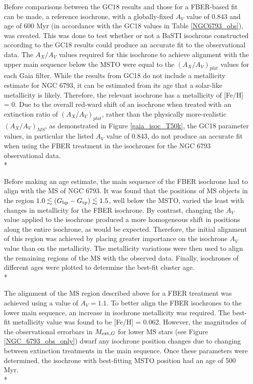 \documentclass[12pt, a4paper]{report}
\begin{document}
Before comparisons between the GC18 results and those for a FBER-based fit can be made, a reference isochrone, with a globally-fixed $A_{V}$ value of 0.843 and age of 600 Myr (in accordance with the GC18 values in Table \ref{NGC6793_obs}), was created. This was done to test whether or not a BaSTI isochrone constructed according to the GC18 results could produce an accurate fit to the observational data. The $A_{X}/A_{V}$ values required for this isochrone to achieve alignment with the upper main sequence below the MSTO were equal to the $(A_{X}/A_{V})_{plat}$ values for each Gaia filter. While the results from GC18 do not include a metallicity estimate for NGC 6793, it can be estimated from its age that a solar-like metallicity is likely. Therefore, the relevant isochrone has a metallicity of [Fe/H] = 0. Due to the overall red-ward shift of an isochrone when treated with an extinction ratio of $(A_{X}/A_{V})_{plat}$, rather than the physically more-realistic $(A_{X}/A_{V})_{MS}$, as demonstrated in Figure \ref{gaia_isoc_T50k}, the GC18 parameter values, in particular the listed $A_{V}$ value of 0.843, do not produce an accurate fit when using the FBER treatment in the isochrones for the NGC 6793 observational data.\\*

Before making an age estimate, the main sequence of the FBER isochrone had to align with the MS of NGC 6793. It was found that the positions of MS objects in the region $1.0 \lesssim (G_{\textnormal{bp}}-G_{\textnormal{rp}}) \lesssim 1.5$, well below the MSTO, varied the least with changes in metallicity for the FBER isochrone. By contrast, changing the $A_{V}$ value applied to the isochrone produced a more homogeneous shift in positions along the entire isochrone, as would be expected. Therefore, the initial alignment of this region was achieved by placing greater importance on the isochrone $A_{V}$ value than on the metallicity. The metallicity variations were then used to align the remaining regions of the MS with the observed data. Finally, isochrones of different ages were plotted to determine the best-fit cluster age. \\*

The alignment of the MS region described above for a FBER treatment was achieved using a value of $A_{V} = 1.1$. To better align the FBER isochrones to the lower main sequence, an increase in isochrone metallicity was required. The best-fit metallicity value was found to be [Fe/H] = 0.062. However, the magnitudes of the observational errorbars in $M_{\textnormal{ext},G}$ for lower MS stars (see Figure \ref{NGC_6793_obs_only}) dwarf any isochrone position changes due to changing between extinction treatments in the main sequence. Once these parameters were determined, the isochrone with best-fitting MSTO position had an age of 500 Myr.\\*
\end{document}

